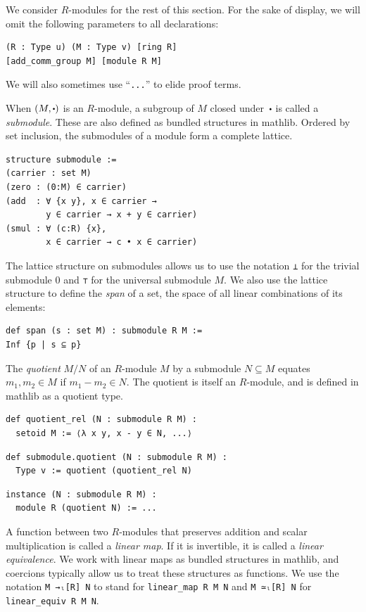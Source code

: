 \documentclass[sigplan]{acmart}\settopmatter{}
\newcommand{\mathlib}{\textsf{mathlib}\xspace}
\newcommand\smul[1][.5]{\mathbin{\vcenter{\hbox{\scalebox{#1}{$\bullet$}}}}}
\begin{document}
We consider $R$-modules for the rest of this section.
For the sake of display, 
we will omit the following parameters to all declarations:
\begin{lstlisting}
(R : Type u) (M : Type v) [ring R]
[add_comm_group M] [module R M]
\end{lstlisting}
We will also sometimes use ``\lstinline{...}'' to elide proof terms.


When $(M, \smul)$ is an $R$-module,
a subgroup of $M$ closed under~$\smul$ is called a \emph{submodule}.
These are also defined as bundled structures in \mathlib.
Ordered by set inclusion, the submodules of a module form a complete lattice.

\begin{lstlisting}
structure submodule :=
(carrier : set M)
(zero : (0:M) ∈ carrier)
(add  : ∀ {x y}, x ∈ carrier →
        y ∈ carrier → x + y ∈ carrier)
(smul : ∀ (c:R) {x},
        x ∈ carrier → c • x ∈ carrier)
\end{lstlisting}
The lattice structure on submodules allows us to use
the notation \lstinline{⊥} for the trivial submodule ${0}$
and \lstinline{⊤} for the universal submodule $M$.
We also use the lattice structure to define the \emph{span} of a set,
the space of all linear combinations of its elements:

\begin{lstlisting}
def span (s : set M) : submodule R M :=
Inf {p | s ⊆ p}
\end{lstlisting}

The \emph{quotient} $M/N$ of an $R$-module $M$ by a submodule $N \subseteq M$
equates $m_1,m_2 \in M$ if $m_1 - m_2 \in N$.
The quotient is itself an $R$-module,
and is defined in \mathlib as a quotient type.

\begin{lstlisting}
def quotient_rel (N : submodule R M) :
  setoid M := ⟨λ x y, x - y ∈ N, ...⟩
\end{lstlisting}
\begin{lstlisting}
def submodule.quotient (N : submodule R M) :
  Type v := quotient (quotient_rel N)
\end{lstlisting}
\begin{lstlisting}
instance (N : submodule R M) :
  module R (quotient N) := ...
\end{lstlisting}

A function between two $R$-modules that preserves addition and scalar multiplication
is called a \emph{linear map}.
If it is invertible, it is called a \emph{linear equivalence}.
We work with linear maps as bundled structures in \mathlib,
and coercions typically allow us to treat these structures as functions.
We use the notation \lstinline{M →ₗ[R] N} to stand for \lstinline{linear_map R M N}
and \lstinline{M ≃ₗ[R] N} for \lstinline{linear_equiv R M N}.
\end{document}
